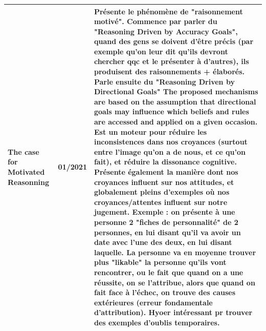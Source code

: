 \documentclass[french]{article}
\begin{document}
\begin{table}[ht!]
\begin{center}
\begin{tabular}{|p{}|p{}|p{}|}
            \hline
            The case for Motivated Reasonning \cite{kunda_case_1990}
            & 01/2021
            & Présente le phénomène de "raisonnement motivé". Commence par parler du "Reasoning Driven by Accuracy Goals", quand des gens se doivent d'être précis (par exemple qu'on leur dit qu'ils devront chercher qqc et le présenter à d'autres), ils produisent des raisonnements + élaborés. Parle ensuite du "Reasoning Driven by Directional Goals" The proposed  mechanisms are based on the assumption that directional  goals  may influence  which beliefs and rules are accessed and applied on a given occasion. Est un moteur pour réduire les inconsistences dans nos croyances (surtout entre l'image qu'on a de nous, et ce qu'on fait), et réduire la dissonance cognitive. Présente également la manière dont nos croyances influent sur nos attitudes, et globalement pleins d'exemples où nos croyances/attentes influent sur notre jugement. Exemple : on présente à une personne 2 "fiches de personnalité" de 2 personnes, en lui disant qu'il va avoir un date avec l'une des deux, en lui disant laquelle. La personne va en moyenne trouver plus "likable" la personne qu'ils vont rencontrer, ou le fait que quand on a une réussite, on se l'attribue, alors que quand on fait face à l'échec, on trouve des causes extérieures (erreur fondamentale d'attribution). Hyoer intéressant pr trouver des exemples d'oublis temporaires.
            \\
            \hline
        \end{tabular}
    \end{center}
    \end{table}
    \newpage
\end{document}
